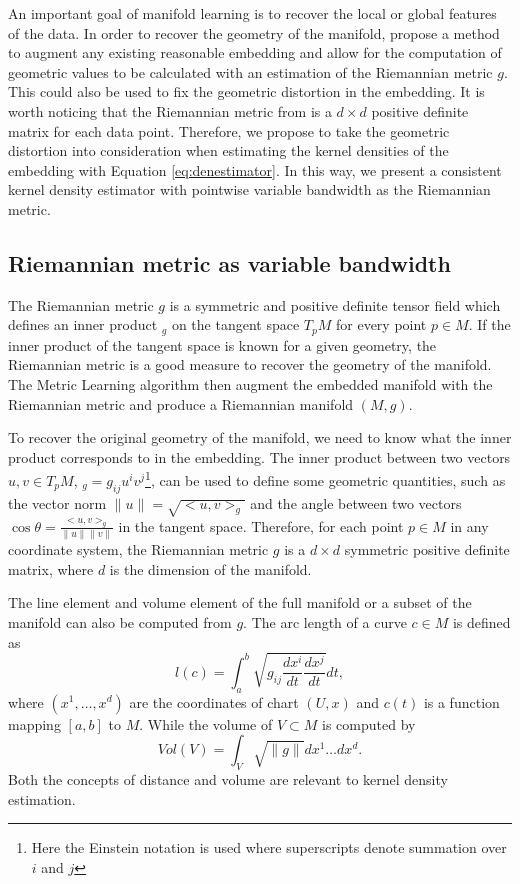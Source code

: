 \documentclass[11pt,a4paper,]{article}
\begin{document}
An important goal of manifold learning is to recover the local or global
features of the data. In order to recover the geometry of the manifold,
\textcite{Perrault-Joncas2013-pq} propose a method to augment any existing
reasonable embedding and allow for the computation of geometric values
to be calculated with an estimation of the Riemannian metric \(g\). This
could also be used to fix the geometric distortion in the embedding. It
is worth noticing that the Riemannian metric from
\textcite{Perrault-Joncas2013-pq} is a \(d\times d\) positive definite matrix for
each data point. Therefore, we propose to take the geometric distortion
into consideration when estimating the kernel densities of the embedding
with Equation \eqref{eq:denestimator}. In this way, we present a
consistent kernel density estimator with pointwise variable bandwidth as
the Riemannian metric.

\hypertarget{riemannian-metric-as-variable-bandwidth}{%
\subsection{Riemannian metric as variable bandwidth}\label{riemannian-metric-as-variable-bandwidth}}

The Riemannian metric \(g\) is a symmetric and positive definite tensor
field which defines an inner product \(<,>_g\) on the tangent space \(T_pM\)
for every point \(p \in M\). If the inner product of the tangent space is
known for a given geometry, the Riemannian metric is a good measure to
recover the geometry of the manifold. The Metric Learning algorithm
\autocite{Perrault-Joncas2013-pq} then augment the embedded manifold with the
Riemannian metric and produce a Riemannian manifold \((M, g)\).

To recover the original geometry of the manifold, we need to know what
the inner product corresponds to in the embedding. The inner product
between two vectors \(u,v \in T_pM\), \(<u,v>_g=g_{ij}u^iv^j\)\footnote{Here the Einstein notation is used where superscripts denote
  summation over \(i\) and \(j\)}, can be
used to define some geometric quantities, such as the vector norm
\(\|u\|=\sqrt{<u,v>_g}\) and the angle between two vectors
\(\cos{\theta}=\frac{<u,v>_g}{\|u\|\|v\|}\) in the tangent space.
Therefore, for each point \(p\in M\) in any coordinate system, the
Riemannian metric \(g\) is a \(d\times d\) symmetric positive definite
matrix, where \(d\) is the dimension of the manifold.

The line element and volume element of the full manifold or a subset of
the manifold can also be computed from \(g\). The arc length of a curve
\(c\in M\) is defined as \[
l(c)=\int_a^b \sqrt{g_{ij} \frac{dx^i}{dt} \frac{dx^j}{dt}} dt,
\] where \((x^1,\dots,x^d)\) are the coordinates of chart \((U,x)\) and
\(c(t)\) is a function mapping \([a,b]\) to \(M\). While the volume of
\(V\subset M\) is computed by \[
Vol(V)=\int_V \sqrt{\|g\|} dx^1\dots dx^d.
\] Both the concepts of distance and volume are relevant to kernel
density estimation.
\end{document}
